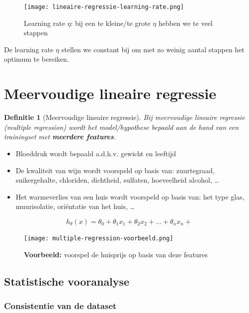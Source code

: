 \documentclass{article}
\newtheorem{theorem}{Definitie}[section]
\begin{document}
\begin{figure}[H]
    \centering
    \texttt{[image: lineaire-regressie-learning-rate.png]}
    \caption{Learning rate $\eta$: bij een te kleine/te grote $\eta$ hebben we te veel stappen}
\end{figure}

De learning rate $\eta$ stellen we constant bij om met zo weinig aantal stappen het optimum te bereiken.


\section{Meervoudige lineaire regressie}

\begin{theorem}[Meervoudige lineaire regressie]
Bij meervoudige lineaire regressie (multiple regression) wordt het model/hypothese bepaald 
aan de hand van een trainingset met \textbf{meerdere features}.
\end{theorem}

\begin{itemize}
    \item Bloeddruk wordt bepaald a.d.h.v. gewicht en leeftijd
    \item De kwaliteit van wijn wordt voorspeld op basis van: zuurtegraad, suikergehalte, chloriden, dichtheid, sulfaten, hoeveelheid alcohol, \dots
    \item Het warmeverlies van een huis wordt voorspeld op basis van: het type glas, muurisolatie, oriëntatie van het huis, \dots
\end{itemize}

\begin{equation}
h_{\theta}(x) = \theta_0 + \theta_1x_1 + \theta_2x_2 + \dots + \theta_nx_n + 
\end{equation}

\begin{figure}[H]
    \centering
    \texttt{[image: multiple-regression-voorbeeld.png]}
    \caption{\textbf{Voorbeeld:} voorspel de huisprijs op basis van deze features }
\end{figure}

\subsection{Statistische vooranalyse}

\subsubsection{Consistentie van de dataset}
\end{document}
